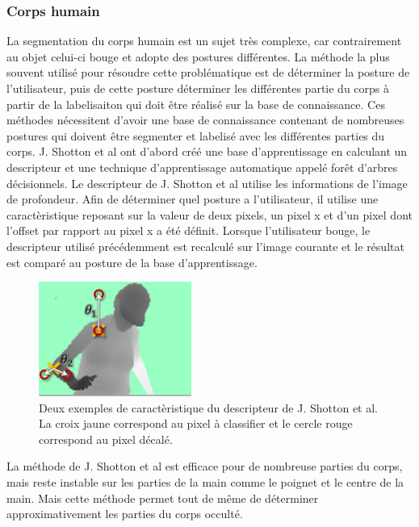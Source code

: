\subsubsection{Corps humain}
La segmentation du corps humain est un sujet très complexe, car contrairement au objet celui-ci bouge et adopte
des postures différentes. La méthode la plus souvent utilisé pour résoudre cette problématique est de déterminer
la posture de l'utilisateur, puis de cette posture déterminer les différentes partie du corps à partir de la labelisaiton
qui doit être réalisé sur la base de connaissance. 
Ces méthodes nécessitent d'avoir une base de connaissance contenant de nombreuses postures qui doivent
être segmenter et labelisé avec les différentes parties du corps. J. Shotton et al\cite{kinectSegmentation} ont
d'abord créé une base d'apprentissage en calculant un descripteur
et une technique d'apprentissage automatique appelé forêt d'arbres décisionnels\cite{randomDecisionForest}. 
Le descripteur de J. Shotton et al\cite{kinectSegmentation} utilise les informations de l'image de 
profondeur. Afin de déterminer quel posture a l'utilisateur, il utilise une caractèristique reposant sur la valeur
de deux pixels, un pixel x et d'un pixel dont l'offset par rapport au pixel x a été définit.
Lorsque l'utilisateur bouge, le descripteur utilisé précédemment est recalculé sur l'image courante et le résultat 
est comparé au posture de la base d'apprentissage.\\

\begin{figure}[!ht]
  \begin{center}
    \includegraphics[width=5cm]{image/shotton.png}
    \caption{Deux exemples de caractèristique du descripteur de J. Shotton et al\cite{kinectSegmentation}. 
    La croix jaune correspond au pixel à classifier et le cercle rouge correspond au pixel décalé.}
  \end{center}
\end{figure}

La méthode de J. Shotton et al\cite{kinectSegmentation} est efficace pour de nombreuse parties du corps, 
mais reste instable sur les parties de la main comme le poignet et le centre de la main. Mais cette méthode permet 
tout de même de déterminer approximativement les parties du corps occulté.\\

